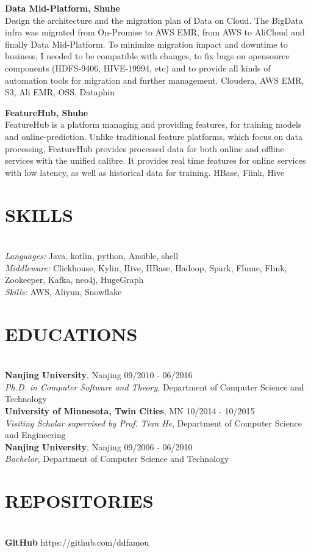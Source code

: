 \documentclass{res}
\begin{document}
\begin{resume}
\vspace{-10pt}
{\bf Data Mid-Platform, Shuhe} \\
Design the architecture and the migration plan of Data on Cloud.
The BigData infra was migrated from On-Promise to AWS EMR, from AWS to AliCloud and finally Data Mid-Platform.
To minimize migration impact and downtime to business,
I needed to be compatible with changes, to fix bugs on opensource components (HDFS-9406, HIVE-19994, etc)
and to provide all kinds of automation tools for migration and further management.
Cloudera, AWS EMR, S3, Ali EMR, OSS, Dataphin


\vspace{-10pt}
{\bf FeatureHub, Shuhe} \\
FeatureHub is a platform managing and providing features, for training models and online-prediction. 
Unlike traditional feature platforms, which focus on data processing, 
FeatureHub provides processed data for both online and offline services with the unified calibre. 
It provides real time features for online services with low latency, as well as historical data for training.
HBase, Flink, Hive


\vspace{-12pt}
\section{SKILLS}\label{sec:skills}
\vspace{-10pt}
\hrulefill\\
{\sl Languages:} Java, kotlin, python, Ansible, shell\\
{\sl Middleware:} Clickhouse, Kylin, Hive, HBase, Hadoop, Spark, Flume, Flink, Zookeeper, Kafka, neo4j, HugeGraph\\
{\sl Skills:} AWS, Aliyun, Snowflake


\vspace{-12pt}
\section{{EDUCATIONS}}\label{sec:educations}
\vspace{-10pt}
\hrulefill\\
{\bf Nanjing University}, Nanjing \hfill  09/2010 - 06/2016 \\
{\sl Ph.D. in Computer Software and Theory}, Department of Computer Science and Technology\\
{\bf University of Minnesota, Twin Cities}, MN \hfill 10/2014 - 10/2015 \\
{\sl Visiting Scholar supervised by Prof. Tian He}, Department of Computer Science and Engineering\\
{\bf Nanjing University}, Nanjing  \hfill 09/2006 - 06/2010 \\
{\sl Bachelor}, Department of  Computer Science and Technology\\

\vspace{-20pt}
\section{{REPOSITORIES}}\label{sec:repositories}
\vspace{-10pt}
\hrulefill\\
{\bf GitHub} \hfill https://github.com/ddfamou

\end{resume}
\end{document}
